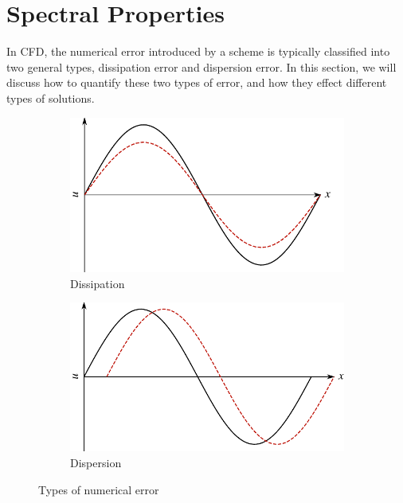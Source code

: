 \chapter{Spectral Properties}\label{ch:spectralproperties}
In CFD, the numerical error introduced by a scheme is typically classified into two general types, dissipation error and dispersion error. In this section, we will discuss how to quantify these two types of error, and how they effect different types of solutions.

\begin{figure}[htbp]
	\centering
	\begin{subfigure}[b]{0.49\linewidth}
		\includegraphics[width=\linewidth]{Pictures/dissipation_diagram}
		\caption{Dissipation}
	\end{subfigure}
	\begin{subfigure}[b]{0.49\linewidth}
		\includegraphics[width=\linewidth]{Pictures/dispersion_diagram}
		\caption{Dispersion}
	\end{subfigure}
	\caption{Types of numerical error}
	\label{fig:numerical_error}
\end{figure}



